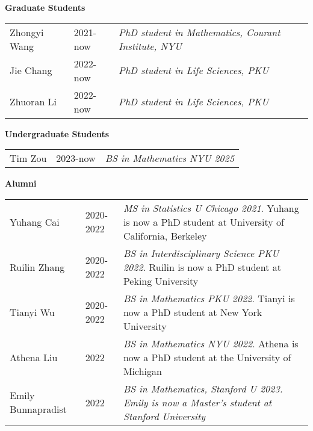 \textbf{Graduate Students} 
\begin{tabular}{
  p{}%
  p{}%
  p{}%
  }

Zhongyi Wang & 2021-now & \textit{PhD student in Mathematics, Courant Institute, NYU} \\
Jie Chang & 2022-now & \textit{PhD student in Life Sciences, PKU} \\
Zhuoran Li & 2022-now & \textit{PhD student in Life Sciences, PKU}
\end{tabular}

\textbf{Undergraduate Students} 
\begin{tabular}{
  p{}%
  p{}%
  p{}%
  }
Tim Zou & 2023-now & \textit{BS in Mathematics NYU 2025}
\end{tabular}

\textbf{Alumni} 
\begin{tabular}{
  p{}%
  p{}%
  p{}%
  }
Yuhang Cai & 2020-2022 & \textit{MS in Statistics U Chicago 2021}. Yuhang is now a PhD student at University of California, Berkeley \\
Ruilin Zhang & 2020-2022 & \textit{BS in Interdisciplinary Science PKU 2022}. Ruilin is now a PhD student at Peking University \\
Tianyi Wu & 2020-2022 & \textit{BS in Mathematics PKU 2022}. Tianyi is now a PhD student at New York University\\
Athena Liu & 2022 & \textit{BS in Mathematics NYU 2022}. Athena is now a PhD student at the University of Michigan \\
Emily Bunnapradist & 2022 & \textit{BS in Mathematics, Stanford U 2023. Emily is now a Master's student at Stanford University} 
\end{tabular}



